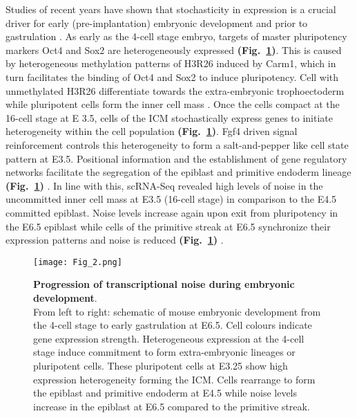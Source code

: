 Studies of recent years have shown that stochasticity in expression is a crucial driver for early (pre-implantation) embryonic development and prior to gastrulation \citep{Dietrich2007}. As early as the 4-cell stage embryo, targets of master pluripotency markers \Gls{Oct4} and \Gls{Sox2} are heterogeneously expressed \textbf{(Fig.~\ref{fig0:noise_development})}. This is caused by heterogeneous methylation patterns of \Gls{H3R26} induced by \Gls{Carm1}, which in turn facilitates the binding of Oct4 and Sox2 to induce pluripotency. Cell with unmethylated H3R26 differentiate towards the extra-embryonic trophoectoderm while pluripotent cells form the inner cell mass \citep{Goolam2016}. Once the cells compact at the 16-cell stage at \Gls{E} 3.5, cells of the \gls{ICM} stochastically express genes to initiate heterogeneity within the cell population \textbf{(Fig.~\ref{fig0:noise_development})}. Fgf4 driven signal reinforcement controls this heterogeneity to form a salt-and-pepper like cell state pattern at E3.5. Positional information and the establishment of gene regulatory networks facilitate the segregation of the epiblast and primitive endoderm lineage \textbf{(Fig.~\ref{fig0:noise_development})} \citep{Ohnishi2014}. In line with this, scRNA-Seq revealed high levels of noise in the uncommitted inner cell mass at E3.5 (16-cell stage) in comparison to the E4.5 committed epiblast. Noise levels increase again upon exit from pluripotency in the E6.5 epiblast while cells of the primitive streak at E6.5 synchronize their expression patterns and noise is reduced \textbf{(Fig.~\ref{fig0:noise_development})} \citep{Mohammed2017}.

\begin{figure}[!h]
\centering
\texttt{[image: Fig\_2.png]}
\caption[Progression of transcriptional heterogeneity during embryonic development]{\textbf{Progression of transcriptional noise during embryonic development}.\\
From left to right: schematic of mouse embryonic development from the 4-cell stage to early gastrulation at E6.5. Cell colours indicate gene expression strength. Heterogeneous expression at the 4-cell stage induce commitment to form extra-embryonic lineages or pluripotent cells. These pluripotent cells at E3.25 show high expression heterogeneity forming the \gls{ICM}. Cells rearrange to form the epiblast and primitive endoderm at E4.5 while noise levels increase in the epiblast at E6.5 compared to the primitive streak.}
\label{fig0:noise_development}
\end{figure}

